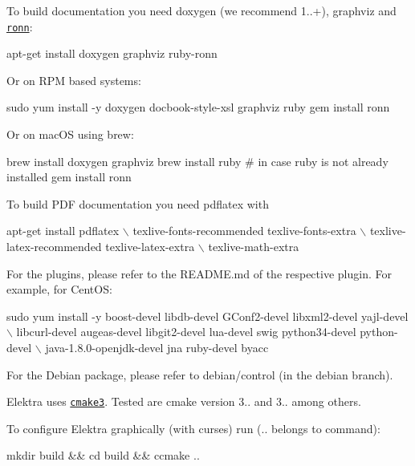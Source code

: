 To build documentation you need doxygen (we recommend 1..+), graphviz and \href{https://github.com/rtomayko/ronn/blob/master/INSTALLING#files}{\tt ronn}\+:


\begin{DoxyCode}
apt-get install doxygen graphviz ruby-ronn
\end{DoxyCode}


Or on R\+PM based systems\+:


\begin{DoxyCode}
sudo yum install -y doxygen docbook-style-xsl graphviz ruby
gem install ronn
\end{DoxyCode}


Or on mac\+OS using brew\+:


\begin{DoxyCode}
brew install doxygen graphviz
brew install ruby # in case ruby is not already installed
gem install ronn
\end{DoxyCode}


To build P\+DF documentation you need {\ttfamily pdflatex} with


\begin{DoxyCode}
apt-get install pdflatex \(\backslash\)
        texlive-fonts-recommended texlive-fonts-extra \(\backslash\)
        texlive-latex-recommended texlive-latex-extra \(\backslash\)
        texlive-math-extra
\end{DoxyCode}


For the plugins, please refer to the R\+E\+A\+D\+M\+E.\+md of the respective plugin. For example, for Cent\+OS\+:


\begin{DoxyCode}
sudo yum install -y boost-devel libdb-devel GConf2-devel libxml2-devel yajl-devel   \(\backslash\)
libcurl-devel augeas-devel libgit2-devel lua-devel swig python34-devel python-devel \(\backslash\)
java-1.8.0-openjdk-devel jna ruby-devel byacc
\end{DoxyCode}


For the Debian package, please refer to debian/control (in the debian branch).

Elektra uses \href{https://cmake.org/cmake/help/v3.0/}{\tt cmake3}. Tested are cmake version 3.. and 3.. among others.

To configure Elektra graphically (with curses) run ({\ttfamily ..} belongs to command)\+:


\begin{DoxyCode}
mkdir build && cd build && ccmake ..
\end{DoxyCode}


